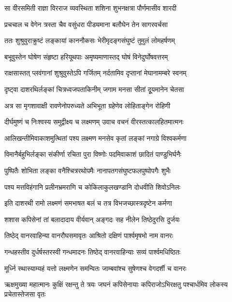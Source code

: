 
\twolineshloka
{सा वीरसमिती राज्ञा विरराज व्यवस्थिता}
{शशिना शुभनक्षत्रा पौर्णमासीव शारदी} %

\twolineshloka
{प्रचचाल च वेगेन त्रस्ता चैव वसुंधरा}
{पीड्यमाना बलौघेन तेन सागरवर्चसा} %

\twolineshloka
{ततः शुश्रुवुराक्रुष्टं लङ्कायां काननौकसः}
{भेरीमृदङ्गसंघुष्टं तुमुलं लोमहर्षणम्} %

\twolineshloka
{बभूवुस्तेन घोषेण संहृष्टा हरियूथपाः}
{अमृष्यमाणास्तद् घोषं विनेदुर्घोषवत्तरम्} %

\twolineshloka
{राक्षसास्तत् प्लवंगानां शुश्रुवुस्तेऽपि गर्जितम्}
{नर्दतामिव दृप्तानां मेघानामम्बरे स्वनम्} %

\twolineshloka
{दृष्ट्वा दाशरथिर्लङ्कां चित्रध्वजपताकिनीम्}
{जगाम मनसा सीतां दूूयमानेन चेतसा} %

\twolineshloka
{अत्र सा मृगशावाक्षी रावणेनोपरुध्यते}
{अभिभूता ग्रहेणेव लोहिताङ्गेन रोहिणी} %

\twolineshloka
{दीर्घमुष्णं च निःश्वस्य समुद्वीक्ष्य च लक्ष्मणम्}
{उवाच वचनं वीरस्तत्कालहितमात्मनः} %

\twolineshloka
{आलिखन्तीमिवाकाशमुत्थितां पश्य लक्ष्मण}
{मनसेव कृतां लङ्कां नगाग्रे विश्वकर्मणा} %

\twolineshloka
{विमानैर्बहुभिर्लङ्का संकीर्णा रचिता पुरा}
{विष्णोः पदमिवाकाशं छादितं पाण्डुभिर्घनैः} %

\twolineshloka
{पुष्पितैः शोभिता लङ्का वनैश्चित्ररथोपमैः}
{नानापतगसंघुष्टफलपुष्पोपगैः शुभैः} %

\twolineshloka
{पश्य मत्तविहंगानि प्रलीनभ्रमराणि च}
{कोकिलाकुलखण्डानि दोधवीति शिवोऽनिलः} %

\twolineshloka
{इति दाशरथी रामो लक्ष्मणं समभाषत}
{बलं च तत्र विभजच्छास्त्रदृष्टेन कर्मणा} %

\twolineshloka
{शशास कपिसेनां तां बलादादाय वीर्यवान्}
{अङ्गदः सह नीलेन तिष्ठेदुरसि दुर्जयः} %

\twolineshloka
{तिष्ठेद् वानरवाहिन्या वानरौघसमावृतः}
{आश्रितो दक्षिणं पार्श्वमृषभो नाम वानरः} %

\twolineshloka
{गन्धहस्तीव दुर्धर्षस्तरस्वी गन्धमादनः}
{तिष्ठेद् वानरवाहिन्याः सव्यं पार्श्वमधिष्ठितः} %

\twolineshloka
{मूर्ध्नि स्थास्याम्यहं यत्तो लक्ष्मणेन समन्वितः}
{जाम्बवांश्च सुषेणश्च वेगदर्शी च वानरः} %

\threelineshloka
{ऋक्षमुख्या महात्मानः कुक्षिं रक्षन्तु ते त्रयः}
{जघनं कपिसेनायाः कपिराजोऽभिरक्षतु}
{पश्चार्धमिव लोकस्य प्रचेतास्तेजसा वृतः} %

